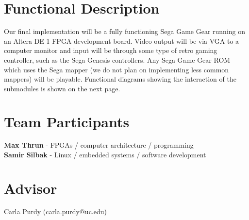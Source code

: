 \documentclass[11pt]{article}
\begin{document}
\section*{Functional Description}
Our final implementation will be a fully functioning Sega Game Gear running on an Altera DE-1 FPGA
development board. Video output will be via VGA to a computer monitor and input will be through some type of retro
gaming controller, such as the Sega Genesis controllers. Any Sega Game Gear ROM which uses the Sega mapper 
(we do not plan on implementing less common mappers) will be playable. Functional diagrams showing the interaction of
the submodules is shown on the next page.

\section*{Team Participants}
{\bf Max Thrun} - FPGAs / computer architecture / programming  
\\
{\bf Samir Silbak} - Linux / embedded systems / software development

\section*{Advisor}
Carla Purdy (carla.purdy@uc.edu)
\end{document}
